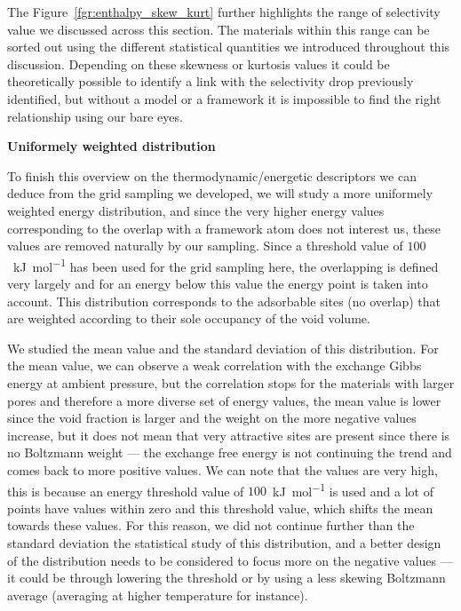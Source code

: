 \documentclass[main]{subfiles}
\begin{document}
The Figure~\ref{fgr:enthalpy_skew_kurt} further highlights the range of selectivity value we discussed across this section. The materials within this range can be sorted out using the different statistical quantities we introduced throughout this discussion. Depending on these skewness or kurtosis values it could be theoretically possible to identify a link with the selectivity drop previously identified, but without a model or a framework it is impossible to find the right relationship using our bare eyes.


\textbf{Uniformely weighted distribution}

To finish this overview on the thermodynamic/energetic descriptors we can deduce from the grid sampling we developed, we will study a more uniformely weighted energy distribution, and since the very higher energy values corresponding to the overlap with a framework atom does not interest us, these values are removed naturally by our sampling. Since a threshold value of $100$~\si{\kilo\joule\per\mole} has been used for the grid sampling here, the overlapping is defined very largely and for an energy below this value the energy point is taken into account. This distribution corresponds to the adsorbable sites (no overlap) that are weighted according to their sole occupancy of the void volume. 

We studied the mean value and the standard deviation of this distribution. For the mean value, we can observe a weak correlation with the exchange Gibbs energy at ambient pressure, but the correlation stops for the materials with larger pores and therefore a more diverse set of energy values, the mean value is lower since the void fraction is larger and the weight on the more negative values increase, but it does not mean that very attractive sites are present since there is no Boltzmann weight --- the exchange free energy is not continuing the trend and comes back to more positive values. We can note that the values are very high, this is because an energy threshold value of $100$~\si{\kilo\joule\per\mole} is used and a lot of points have values within zero and this threshold value, which shifts the mean towards these values. For this reason, we did not continue further than the standard deviation the statistical study of this distribution, and a better design of the distribution needs to be considered to focus more on the negative values --- it could be through lowering the threshold or by using a less skewing Boltzmann average (averaging at higher temperature for instance).
\end{document}
